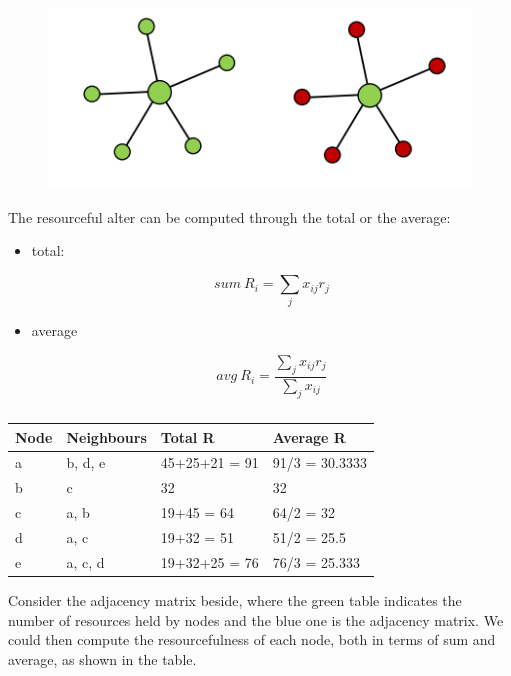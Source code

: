 \documentclass[
  notitlepage,
  onecolumn,
  openany]{book}
\begin{document}
\begin{figure}[h!]

{\centering \includegraphics[width=0.5\linewidth]{images/06-Attributes based measures/Untitled} 

}

\end{figure}

The resourceful alter can be computed through the total or the average:

\begin{itemize}
\item
  total:

  \[
    sum \ R_i = \sum_j x_{ij}r_j
    \]
\item
  average

  \[
    avg \ R_i = \frac{ \sum_j x_{ij}r_j}{\sum_j x_{ij}}
    \]
\end{itemize}

\begin{table}[]
\centering
\begin{tabular}{@{}llll@{}}
\toprule
\textbf{Node} & \textbf{Neighbours} & \textbf{Total R} & \textbf{Average R} \\ \midrule
a             & b, d, e             & 45+25+21 = 91    & 91/3 = 30.3333     \\
b             & c                   & 32               & 32                 \\
c             & a, b                & 19+45 = 64       & 64/2 = 32          \\
d             & a, c                & 19+32 = 51       & 51/2 = 25.5        \\
e             & a, c, d             & 19+32+25 = 76    & 76/3 = 25.333      \\ \bottomrule
\end{tabular}
\caption{}
\label{tab:my-table}
\end{table}

Consider the adjacency matrix beside, where the green table indicates the number of resources held by nodes and the blue one is the adjacency matrix. We could then compute the resourcefulness of each node, both in terms of sum and average, as shown in the table.
\end{document}
